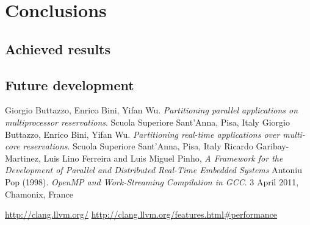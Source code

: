 \documentclass[a4paper,11pt,oneside]{book}
\begin{document}
\chapter{Conclusions}
\section{Achieved results}
\section{Future development}






\begin{thebibliography}{9}
 Giorgio Buttazzo, Enrico Bini, Yifan Wu. \emph{Partitioning parallel applications on multiprocessor reservations}. Scuola Superiore Sant’Anna, Pisa, Italy
 Giorgio Buttazzo, Enrico Bini, Yifan Wu. \emph{Partitioning real-time applications over multi-core reservations}. Scuola Superiore Sant’Anna, Pisa, Italy
 Ricardo Garibay-Martinez, Luis Lino Ferreira and Luis Miguel Pinho, \emph{A Framework for the Development of Parallel and Distributed Real-Time Embedded Systems}
Antoniu Pop (1998). \emph{OpenMP and Work-Streaming Compilation in GCC}. 3 April 2011, Chamonix, France

\url{http://clang.llvm.org/}
\url{http://clang.llvm.org/features.html\#performance}

\end{thebibliography}
\end{document}
